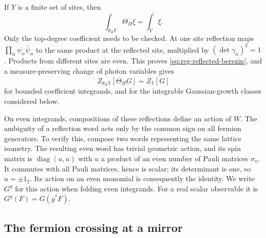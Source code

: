 \documentclass[11pt,letterpaper,reqno]{amsart}
\DeclareMathOperator{\diag}{diag}
\begin{document}
If $Y$ is a finite set of sites, then
\begin{equation}\label{eq:reg-reflected-berezin}
 \int_{\theta_\Pi Y}\Theta_\Pi\xi=\overline{\int_Y\xi}.
\end{equation}
Only the top-degree coefficient needs to be checked. At one site
reflection maps $\prod_\alpha\psi_\alpha\bar\psi_\alpha$ to the same
product at the reflected site, multiplied by $(\det\gamma_n)^2=1$.
Products from different sites are even. This proves
\eqref{eq:reg-reflected-berezin}, and a measure-preserving change of
photon variables gives
\begin{equation}\label{eq:reg-reflected-functional}
 Z_{\theta_\Pi\mathbb T}[\Theta_\Pi G]
 =\overline{Z_{\mathbb T}[G]}
\end{equation}
for bounded coefficient integrands, and for the integrable
Gaussian-growth classes considered below.

On even integrands, compositions of these reflections define an
action of $W$. The ambiguity of a reflection word acts only by the
common sign on all fermion generators. To verify this, compose two
words representing the same lattice isometry. The resulting even
word has trivial geometric action, and its spin matrix is
$\diag(u,u)$ with $u$ a product of an even number of Pauli matrices
$\sigma_n$. It commutes with all Pauli matrices, hence is scalar;
its determinant is one, so $u=\pm1_2$. Its action on an even monomial
is consequently the identity. We write $G^g$ for this action when
folding even integrands. For a real scalar observable it is
$G^g(F)=G(g^*F)$.

\subsection{The fermion crossing at a mirror}\label{subsec:reg-crossing}
\end{document}

